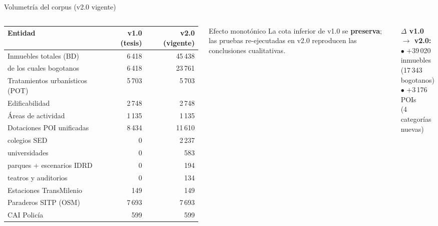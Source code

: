 \documentclass[aspectratio=169,11pt]{beamer}
\newcommand{\hi}[1]{\textcolor{inmuGreen}{\textbf{#1}}}
\begin{document}
\begin{frame}{Volumetría del corpus (v2.0 vigente)}
  \begin{columns}[T,onlytextwidth]
      \scriptsize
      \renewcommand{\arraystretch}{0.92}
      \begin{tabular}{lrr}
        \toprule
        \textbf{Entidad}                 & \textbf{v1.0 (tesis)} & \textbf{v2.0 (vigente)} \\
        \midrule
        Inmuebles totales (BD)            & 6\,418  & 45\,438  \\
        \quad de los cuales bogotanos     & 6\,418  & 23\,761  \\
        \addlinespace
        Tratamientos urbanísticos (POT)   & 5\,703  & 5\,703   \\
        Edificabilidad                    & 2\,748  & 2\,748   \\
        Áreas de actividad                & 1\,135  & 1\,135   \\
        \addlinespace
        Dotaciones POI unificadas         & 8\,434  & 11\,610  \\
        \quad colegios SED                & 0       & 2\,237   \\
        \quad universidades               & 0       & 583      \\
        \quad parques + escenarios IDRD   & 0       & 194      \\
        \quad teatros y auditorios        & 0       & 134      \\
        Estaciones TransMilenio           & 149     & 149      \\
        Paraderos SITP (OSM)              & 7\,693  & 7\,693   \\
        CAI Policía                       & 599     & 599      \\
        \bottomrule
      \end{tabular}
    \null%
      \footnotesize
      \begin{block}{Efecto monotónico}
        \scriptsize La cota inferior de v1.0 se \hi{preserva}; las pruebas re-ejecutadas en v2.0 reproducen las conclusiones cualitativas.
      \end{block}
      \vspace{0.6em}

      {\scriptsize\color{inmuMuted}
      \textbf{$\Delta$ v1.0 $\to$ v2.0:}\\[0.2em]
      $\bullet$ +39\,020 inmuebles\\
      \hspace*{0.5em}(17\,343 bogotanos)\\[0.2em]
      $\bullet$ +3\,176 POIs\\
      \hspace*{0.5em}(4 categorías nuevas)}
  \end{columns}
\end{frame}
\end{document}
